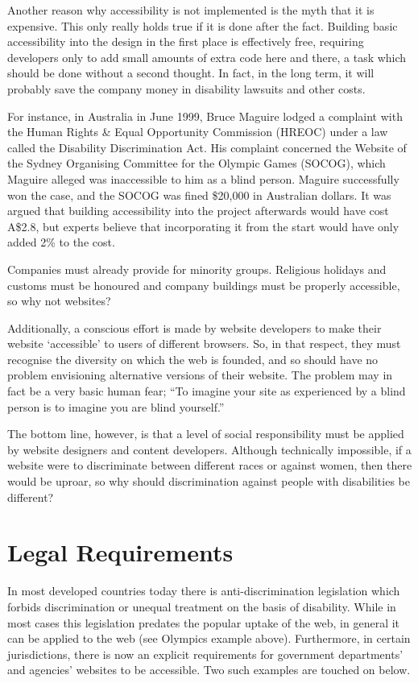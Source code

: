 Another reason why accessibility is not implemented is the myth that it is
expensive. This only really holds true if it is done after the fact. Building
basic accessibility into the design in the first place is effectively free,
requiring developers only to add small amounts of extra code here and there, a
task which should be done without a second thought. In fact, in the long
term, it will probably save the company money in disability lawsuits and
other costs.

For instance, in Australia in June 1999, Bruce Maguire lodged a complaint with
the Human Rights \& Equal Opportunity Commission (HREOC) under a law called the
Disability Discrimination Act. His complaint concerned the Website of the
Sydney Organising Committee for the Olympic Games (SOCOG), which Maguire
alleged was inaccessible to him as a blind person. Maguire successfully won the
case, and the SOCOG was fined \$20,000 in Australian dollars. It was argued
that building accessibility into the project afterwards would have cost A\$2.8,
but experts believe that incorporating it from the start would have only added
2\% to the cost.

Companies must already provide for minority groups. Religious holidays and customs
must be honoured and company buildings must be properly accessible, so
why not websites?

Additionally, a conscious effort is made by website developers to make their
website `accessible' to users of different browsers. So, in that respect, they
must recognise the diversity on which the web is founded, and so should have no
problem envisioning alternative versions of their website. The problem may in
fact be a very basic human fear; ``To imagine your site as experienced by a
blind person is to imagine you are blind yourself.''\cite{joeclark}

The bottom line, however, is that a level of social responsibility must be
applied by website designers and content developers. Although technically
impossible, if a website were to discriminate between different races or
against women, then there would be uproar, so why should discrimination against
people with disabilities be different? 

\section{Legal Requirements}

In most developed countries today there is anti-discrimination legislation
which forbids discrimination or unequal treatment on the basis of disability.
While in most cases this legislation predates the popular uptake of the web, in
general it can be applied to the web (see Olympics example above). Furthermore,
in certain jurisdictions, there is now an explicit requirements for government
departments' and agencies' websites to be accessible. Two such examples are
touched on below.

